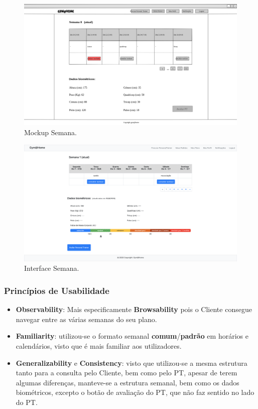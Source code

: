 \begin{figure}[H]
    \centering
    \includegraphics[scale=0.25]{images/mockups/cliente_meus_planos_semana_8_atual.png}
    \caption{Mockup Semana.}
    \label{fig:mockupsemana}
\end{figure}

\begin{figure}[H]
    \centering
    \includegraphics[scale=0.25]{images/interfaces/client_semana.png}
    \caption{Interface Semana.}
    \label{fig:interfacesemana}
\end{figure}

\subsubsection{Princípios de Usabilidade}
\begin{itemize}
    \item \textbf{Observability}: Mais especificamente \textbf{Browsability} pois o Cliente consegue navegar entre as várias semanas do seu plano.
    \item \textbf{Familiarity}: utilizou-se o formato semanal \textbf{comum}/\textbf{padrão} em horários e calendários, visto que é mais familiar aos utilizadores.
    \item \textbf{Generalizability} e \textbf{Consistency}: visto que utilizou-se a mesma estrutura tanto para a consulta pelo Cliente, bem como pelo PT, apesar de terem algumas diferenças, manteve-se a estrutura semanal, bem como os dados biométricos, excepto o botão de avaliação do PT, que não faz sentido no lado do PT.
\end{itemize}

